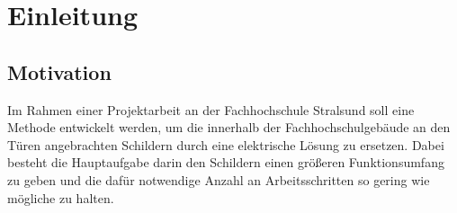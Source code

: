 


\chapter{ Einleitung }\label{chap:Einleitung}
\vspace{-3cm}
\begin{flushleft}
% 
% 

\section{Motivation}
\label{sec:Motivation}
Im Rahmen einer Projektarbeit an der Fachhochschule Stralsund soll eine Methode entwickelt werden, um die innerhalb der Fachhochschulgebäude 
an den Türen angebrachten Schildern durch eine elektrische Lösung zu ersetzen. Dabei besteht die Hauptaufgabe darin den Schildern einen größeren Funktionsumfang zu geben und die dafür notwendige Anzahl an Arbeitsschritten so gering wie mögliche zu halten.  


\end{flushleft}
